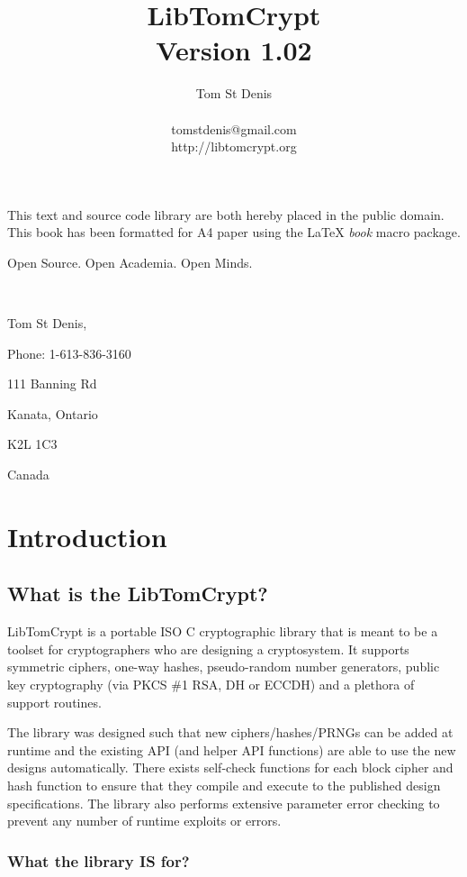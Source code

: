 \documentclass[a4paper]{book}
\begin{document}
\title{LibTomCrypt \\ Version 1.02}
\author{Tom St Denis \\
\\
tomstdenis@gmail.com \\
http://libtomcrypt.org
}
\maketitle
This text and source code library are both hereby placed in the public domain.  This book has been 
formatted for A4 paper using the \LaTeX{} {\em book} macro package.

\vspace{10cm}

\begin{flushright}Open Source.  Open Academia.  Open Minds.

\mbox{ }

Tom St Denis,

Phone: 1-613-836-3160

111 Banning Rd 

Kanata, Ontario 

K2L 1C3 

Canada
\end{flushright}
\newpage
\tableofcontents
\chapter{Introduction}
\section{What is the LibTomCrypt?}
LibTomCrypt is a portable ISO C cryptographic library that is meant to be a toolset for cryptographers who are 
designing a cryptosystem.  It supports symmetric ciphers, one-way hashes, pseudo-random number generators, 
public key cryptography (via PKCS \#1 RSA, DH or ECCDH) and a plethora of support 
routines.  

The library was designed such that new ciphers/hashes/PRNGs can be added at runtime and the existing API 
(and helper API functions) are able to use the new designs automatically.  There exists self-check functions for each 
block cipher and hash function to ensure that they compile and execute to the published design specifications.  The library 
also performs extensive parameter error checking to prevent any number of runtime exploits or errors.

\subsection{What the library IS for?}
\end{document}
